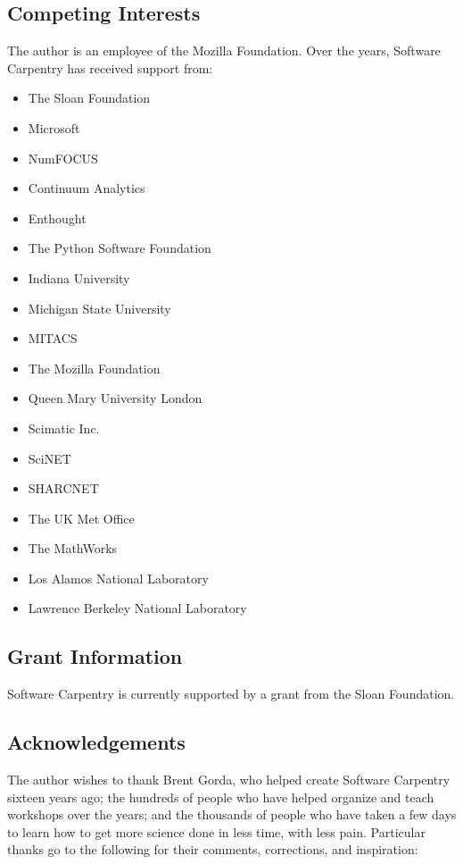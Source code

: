 \documentclass[10pt,a4paper,twocolumn]{article}
\begin{document}
\subsection*{Competing Interests}

The author is an employee of the Mozilla Foundation. Over the years,
Software Carpentry has received support from:

\begin{itemize}
\item
  The Sloan Foundation
\item
  Microsoft
\item
  NumFOCUS
\item
  Continuum Analytics
\item
  Enthought
\item
  The Python Software Foundation
\item
  Indiana University
\item
  Michigan State University
\item
  MITACS
\item
  The Mozilla Foundation
\item
  Queen Mary University London
\item
  Scimatic Inc.
\item
  SciNET
\item
  SHARCNET
\item
  The UK Met Office
\item
  The MathWorks
\item
  Los Alamos National Laboratory
\item
  Lawrence Berkeley National Laboratory
\end{itemize}

\subsection*{Grant Information}

Software Carpentry is currently supported by a grant from the Sloan
Foundation.

\subsection*{Acknowledgements}

The author wishes to thank Brent Gorda, who helped create Software
Carpentry sixteen years ago; the hundreds of people who have helped
organize and teach workshops over the years; and the thousands of
people who have taken a few days to learn how to get more science
done in less time, with less pain.  Particular thanks go to the
following for their comments, corrections, and inspiration:
\end{document}

